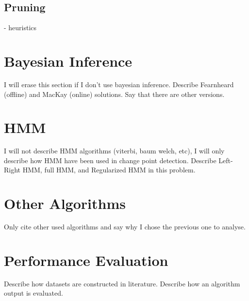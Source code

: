 \subsection{Pruning}
- heuristics

\section{Bayesian Inference}
I will erase this section if I don't use bayesian inference. Describe Fearnheard (offline) and MacKay (online) solutions. Say that there are other versions.

\section{HMM}
I will not describe HMM algorithms (viterbi, baum welch, etc), I will only describe how HMM have been used in change point detection. Describe Left-Right HMM, full HMM, and Regularized HMM in this problem.

\section{Other Algorithms}
Only cite other used algorithms and say why I chose the previous one to analyse.

\section{Performance Evaluation}
  Describe how datasets are constructed in literature. Describe how an algorithm output is evaluated.

